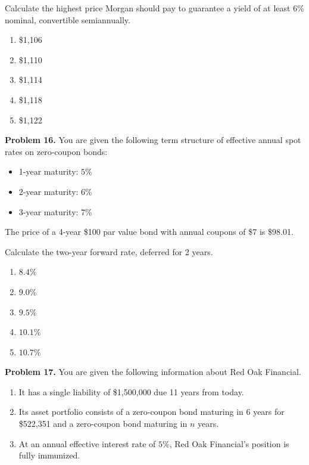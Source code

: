 \documentclass[12pt]{article}
\begin{document}
Calculate the highest price Morgan should pay to guarantee a yield of at least $6\%$ nominal, convertible semiannually.

\vspace{.5cm}

\begin{enumerate}[label = \Alph*.]
\item \$1{,}106
\item \$1{,}110
\item \$1{,}114
\item \$1{,}118
\item \$1{,}122
\end{enumerate}

\newpage

\noindent \textbf{Problem 16.}
You are given the following term structure of effective annual spot rates on zero-coupon bonds:

\begin{itemize}
\item 1-year maturity: $5\%$
\item 2-year maturity: $6\%$
\item 3-year maturity: $7\%$
\end{itemize}

The price of a 4-year \$100 par value bond with annual coupons of \$7 is \$98.01.

Calculate the two-year forward rate, deferred for 2 years.

\vspace{.5cm}

\begin{enumerate}[label = \Alph*.]
\item $8.4\%$
\item $9.0\%$
\item $9.5\%$
\item $10.1\%$
\item $10.7\%$
\end{enumerate}

\newpage

\noindent \textbf{Problem 17.}
You are given the following information about Red Oak Financial.

\begin{enumerate}[label = \roman*.]
\item It has a single liability of \$1{,}500{,}000 due 11 years from today.
\item Its asset portfolio consists of a zero-coupon bond maturing in 6 years for \$522{,}351 and a zero-coupon bond maturing in $n$ years.
\item At an annual effective interest rate of $5\%$, Red Oak Financial's position is fully immunized.
\end{enumerate}
\end{document}
